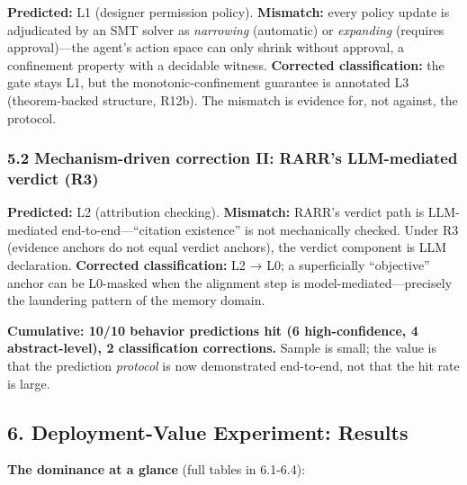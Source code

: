 \documentclass[

]{article}
\begin{document}
\textbf{Predicted:} L1 (designer permission policy). \textbf{Mismatch:} every policy update is adjudicated by an SMT solver as \emph{narrowing} (automatic) or \emph{expanding} (requires approval)---the agent's action space can only shrink without approval, a confinement property with a decidable witness. \textbf{Corrected classification:} the gate stays L1, but the monotonic-confinement guarantee is annotated L3 (theorem-backed structure, R12b). The mismatch is evidence for, not against, the protocol.



\subsubsection{5.2 Mechanism-driven correction II: RARR's LLM-mediated verdict (R3)}\label{mechanism-driven-correction-ii-rarrs-llm-mediated-verdict-r3}



\textbf{Predicted:} L2 (attribution checking). \textbf{Mismatch:} RARR's verdict path is LLM-mediated end-to-end---``citation existence'' is not mechanically checked. Under R3 (evidence anchors do not equal verdict anchors), the verdict component is LLM declaration. \textbf{Corrected classification:} L2 → L0; a superficially ``objective'' anchor can be L0-masked when the alignment step is model-mediated---precisely the laundering pattern of the memory domain.



\textbf{Cumulative: 10/10 behavior predictions hit (6 high-confidence, 4 abstract-level), 2 classification corrections.} Sample is small; the value is that the prediction \emph{protocol} is now demonstrated end-to-end, not that the hit rate is large.



\subsection{6. Deployment-Value Experiment: Results}\label{deployment-value-experiment-results}



\textbf{The dominance at a glance} (full tables in 6.1-6.4):
\end{document}
